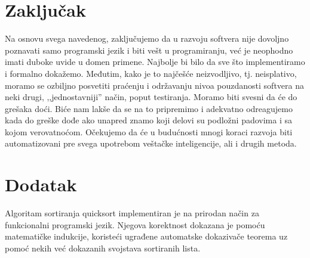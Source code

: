 \documentclass[a4paper]{article}
\begin{document}
\section{Zaključak}
\label{sec:zakljucak}
Na osnovu svega navedenog, zaključujemo da u razvoju softvera nije dovoljno poznavati samo programski jezik i biti vešt u programiranju,
već je neophodno imati duboke uvide u domen primene.
Najbolje bi bilo da sve što implementiramo i formalno dokažemo.
Međutim, kako je to najčešće neizvodljivo, tj. neisplativo, moramo se ozbiljno posvetiti praćenju i održavanju nivoa pouzdanosti softvera
na neki drugi, ,,jednostavniji'' način, poput testiranja.
Moramo biti svesni da će do grešaka doći. 
Biće nam lakše da se na to pripremimo i adekvatno odreagujemo kada do greške dođe
ako unapred znamo koji delovi su podložni padovima i sa kojom verovatnoćom.
Očekujemo da će u budućnosti mnogi koraci razvoja biti automatizovani pre svega upotrebom veštačke inteligencije, ali i drugih metoda.

\appendix
 


\clearpage

\appendix
\section{Dodatak}
\label{sec:dodatak}
Algoritam sortiranja quicksort implementiran je na prirodan način za funkcionalni programski jezik.
Njegova korektnost dokazana je pomoću matematičke indukcije, koristeći ugrađene automatske dokazivače teorema uz pomoć nekih već dokazanih svojstava sortiranih lista.
\end{document}
